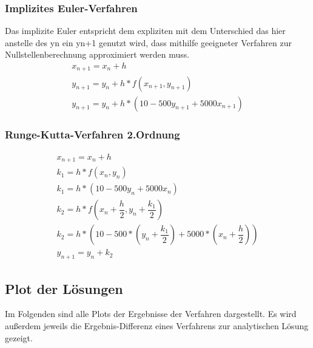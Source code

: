 \documentclass[]{scrartcl}
\begin{document}
\subsubsection{Implizites Euler-Verfahren}
Das implizite Euler entspricht dem expliziten mit dem Unterschied das hier anstelle des yn ein yn+1 genutzt wird, dass mithilfe geeigneter Verfahren zur Nullstellenberechnung approximiert werden muss. 
\begin{align}
x_{n+1} = x_{n}+h \\
y_{n+1} = y_{n}+h*f(x_{n+1},y_{n+1}) \\
y_{n+1} = y_{n}+h*(10-500y_{n+1}+5000x_{n+1})
\end{align}

\subsubsection{Runge-Kutta-Verfahren 2.Ordnung}
\begin{align}
x_{n+1} = x_{n}+h \\
k_{1} = h*f(x_{n},y_{n}) \\
k_{1} = h*(10-500y_{n}+5000x_{n}) \\
k_{2} = h*f(x_{n} + \dfrac{h}{2},y_{n} + \dfrac{k_{1}}{2}) \\
k_{2} = h*(10-500*(y_{n} + \dfrac{k_{1}}{2})+5000*(x_{n} + \dfrac{h}{2})) \\
y_{n+1} = y_{n}+k_{2}
\end{align}

\subsection{Plot der Lösungen}
Im Folgenden sind alle Plots der Ergebnisse der Verfahren dargestellt. Es wird außerdem jeweils die Ergebnis-Differenz eines Verfahrens zur analytischen Lösung gezeigt.
\end{document}
